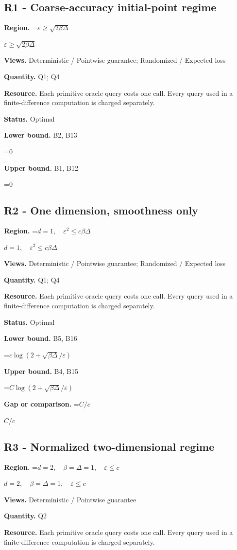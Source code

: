 \documentclass[10pt,a4paper]{article}
\newcommand{\AtlasMath}[1]{\par\begingroup\centering\setbox0=\hbox{$\displaystyle #1$}\ifdim\wd0>1.4\linewidth\typeout{ATLAS WIDE FORMULA: \the\wd0}\fi\ifdim\wd0>\linewidth\resizebox{\linewidth}{!}{\box0}\else\box0\fi\par\endgroup}
\newcommand{\AtlasInlineMath}[1]{\begingroup\setbox0=\hbox{$#1$}\ifdim\wd0>.4\linewidth\endgroup\AtlasMath{#1}\else\endgroup$#1$\fi}
\begin{document}
\subsection{R1 - Coarse-accuracy initial-point regime}
\textbf{Region.} \AtlasInlineMath{\varepsilon\ge\sqrt{2\beta\Delta}}

\textbf{Views.} Deterministic / Pointwise guarantee; Randomized / Expected loss

\textbf{Quantity.} Q1; Q4

\textbf{Resource.} Each primitive oracle query costs one call. Every query used in a finite-difference computation is charged separately.

\textbf{Status.} Optimal

\textbf{Lower bound.} B2, B13

\AtlasMath{0}
\textbf{Upper bound.} B1, B12

\AtlasMath{0}
\subsection{R2 - One dimension, smoothness only}
\textbf{Region.} \AtlasInlineMath{d=1,\quad\varepsilon^2\le c\beta\Delta}

\textbf{Views.} Deterministic / Pointwise guarantee; Randomized / Expected loss

\textbf{Quantity.} Q1; Q4

\textbf{Resource.} Each primitive oracle query costs one call. Every query used in a finite-difference computation is charged separately.

\textbf{Status.} Optimal

\textbf{Lower bound.} B5, B16

\AtlasMath{c\log(2+\sqrt{\beta\Delta}/\varepsilon)}
\textbf{Upper bound.} B4, B15

\AtlasMath{C\log(2+\sqrt{\beta\Delta}/\varepsilon)}
\textbf{Gap or comparison.} \AtlasInlineMath{C/c}

\subsection{R3 - Normalized two-dimensional regime}
\textbf{Region.} \AtlasInlineMath{d=2,\quad\beta=\Delta=1,\quad\varepsilon\le c}

\textbf{Views.} Deterministic / Pointwise guarantee

\textbf{Quantity.} Q2

\textbf{Resource.} Each primitive oracle query costs one call. Every query used in a finite-difference computation is charged separately.
\end{document}
